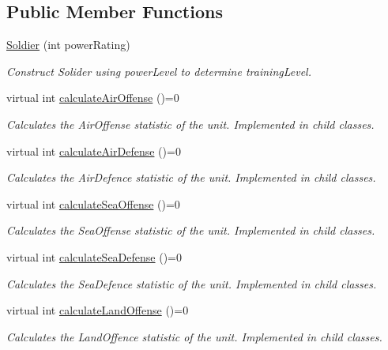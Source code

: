 \subsection*{Public Member Functions}
\begin{DoxyCompactItemize}
\item 
\mbox{\hyperlink{class_soldier_a9663ed35af797ad340b1270e8f77d2a6}{Soldier}} (int power\+Rating)
\begin{DoxyCompactList}\small\item\em Construct Solider using power\+Level to determine training\+Level. \end{DoxyCompactList}\item 
virtual int \mbox{\hyperlink{class_soldier_ad5290f69e84772e9a3bfc060b5d348a0}{calculate\+Air\+Offense}} ()=0
\begin{DoxyCompactList}\small\item\em Calculates the Air\+Offense statistic of the unit. Implemented in child classes. \end{DoxyCompactList}\item 
virtual int \mbox{\hyperlink{class_soldier_a3dc2d7a06621380c4561d330d5359dc2}{calculate\+Air\+Defense}} ()=0
\begin{DoxyCompactList}\small\item\em Calculates the Air\+Defence statistic of the unit. Implemented in child classes. \end{DoxyCompactList}\item 
virtual int \mbox{\hyperlink{class_soldier_acdaf5453ea0f87b3219185b0a52dd869}{calculate\+Sea\+Offense}} ()=0
\begin{DoxyCompactList}\small\item\em Calculates the Sea\+Offense statistic of the unit. Implemented in child classes. \end{DoxyCompactList}\item 
virtual int \mbox{\hyperlink{class_soldier_a6508d8539b427a9af01aabc07ba6ca8e}{calculate\+Sea\+Defense}} ()=0
\begin{DoxyCompactList}\small\item\em Calculates the Sea\+Defence statistic of the unit. Implemented in child classes. \end{DoxyCompactList}\item 
virtual int \mbox{\hyperlink{class_soldier_ac0add7efb3192adb809bc1746c880fc0}{calculate\+Land\+Offense}} ()=0
\begin{DoxyCompactList}\small\item\em Calculates the Land\+Offence statistic of the unit. Implemented in child classes. \end{DoxyCompactList}\item 

\end{DoxyCompactItemize}

